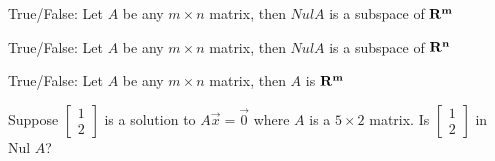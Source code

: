 \documentclass{ximera}
\newcommand{\RR}{\bf R}
\begin{document}
         \begin{question} True/False: Let $A$ be any $m\times n$ matrix, then $Nul A$ is a subspace of $\RR^m$
         	
         	\begin{multipleChoice}
         	\end{multipleChoice}
         	
         \end{question}	
          \begin{question} True/False: Let $A$ be any $m\times n$ matrix, then $Nul A$ is a subspace of $\RR^n$
          	
          	\begin{multipleChoice}
          		\choice[correct]{True}
          		\choice{False}
          	\end{multipleChoice}
          	
          \end{question}	
           \begin{question} True/False: Let $A$ be any $m\times n$ matrix, then  $A$ is $\RR^m$
           	
           	\begin{multipleChoice}
           	\end{multipleChoice}
           	
           \end{question}	
            \begin{question} Suppose $\begin{bmatrix} 1\\2\end{bmatrix}$ is a solution to $A\vec{x} = \vec{0}$ where $A$ is a $5\times 2$ matrix. Is $\begin{bmatrix} 1\\2\end{bmatrix}$ in Nul $A$?
            	
            	\begin{multipleChoice}
            	\end{multipleChoice}
            	
            \end{question}	
\end{document}

